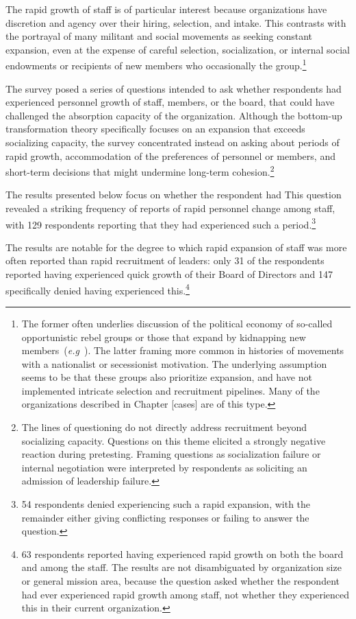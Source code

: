 The rapid growth of staff is of particular interest because organizations have discretion and agency over their hiring, selection, and intake. This contrasts with the portrayal of many militant and social movements as seeking constant expansion, even at the expense of careful selection, socialization, or internal social endowments or recipients of new members who occasionally  the group.\footnote{The former often underlies discussion of the political economy of so-called opportunistic rebel groups or those that expand by kidnapping new members~(\textit{e.g}~\cite{beber2013logic, blattman2010nature, cohen2013female, weinstein2005resources}). The latter framing more common in histories of movements with a nationalist or secessionist motivation. The underlying assumption seems to be that these groups also prioritize expansion, and have not implemented intricate selection and recruitment pipelines. Many of the organizations described in Chapter {[cases]} are of this type.}

The survey posed a series of questions intended to ask whether respondents had experienced personnel growth of staff, members, or the board, that could have challenged the absorption capacity of the organization. Although the bottom-up transformation theory specifically focuses on an expansion that exceeds socializing capacity, the survey concentrated instead on asking about periods of rapid growth, accommodation of the preferences of personnel or members, and short-term decisions that might undermine long-term cohesion.\footnote{The lines of questioning do not directly address recruitment beyond socializing capacity. Questions on this theme elicited a strongly negative reaction during pretesting. Framing questions as socialization failure or internal negotiation were interpreted by respondents as soliciting an admission of leadership failure.}

The results presented below focus on whether the respondent had  This question revealed a striking frequency of reports of rapid personnel change among staff, with 129 respondents reporting that they had experienced such a period.\footnote{54 respondents denied experiencing such a rapid expansion, with the remainder either giving conflicting responses or failing to answer the question.}

The results are notable for the degree to which rapid expansion of staff was more often reported than rapid recruitment of leaders: only 31 of the respondents reported having experienced quick growth of their Board of Directors and 147 specifically denied having experienced this.\footnote{63 respondents reported having experienced rapid growth on both the board and among the staff. The results are not disambiguated by organization size or general mission area, because the question asked whether the respondent had ever experienced rapid growth among staff, not whether they experienced this in their current organization.}

